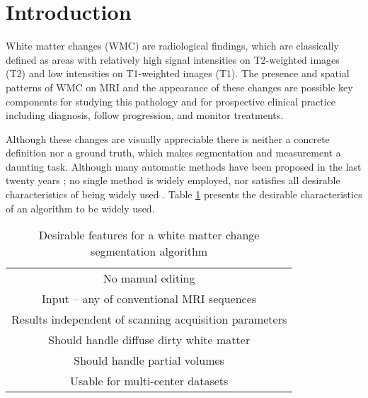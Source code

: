 \section{Introduction} \label{intro}


White matter changes (WMC) are radiological findings, which are classically defined as areas with relatively high signal intensities on T2-weighted images (T2) and low intensities on T1-weighted images (T1). The presence and spatial patterns of WMC on MRI and the appearance of these changes are possible key components for studying this pathology and for prospective clinical practice including diagnosis, follow progression, and monitor treatments.

Although these changes are visually appreciable there is neither a concrete definition nor a ground truth, which makes segmentation and measurement a daunting task. Although many automatic methods have been proposed in the last twenty years \cite{Kamber_1995,Udupa_1997,Boudraa2000,Zijdenbos_2002,LesionTOADS_2010,OutlierLocalIntensity_2011,CascadeOrig,LesionSegmentationToolbox_2012,kNN-TTPs_2013,Rotation-invariant_2015}; no single method is widely employed, nor satisfies all desirable characteristics of being widely used \cite{GarciaReview}. Table \ref{Table:Requirements} presents the desirable characteristics of an algorithm to be widely used.

\begin{table}
\centering
    \begin{tabular}  {  c }
    \hline
        No manual editing \\ 
        Input – any of conventional MRI sequences \\ 
        Results independent of scanning acquisition parameters \\ 
        Should handle diffuse dirty white matter \\ 
        Should handle partial volumes \\ 
        Usable for multi-center datasets \\
    \hline
    \end{tabular} 
    \caption{Desirable features for a white matter change segmentation algorithm } 
    \label{Table:Requirements}
\end{table}
    
